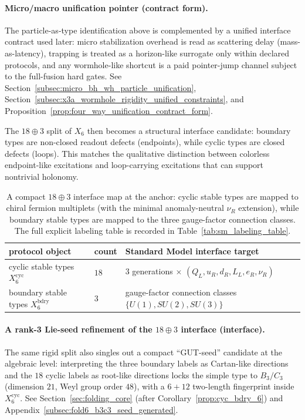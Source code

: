 \paragraph{Micro/macro unification pointer (contract form).}
\AuditTag The particle-as-type identification above is complemented by a unified interface contract used later:
micro stabilization overhead is read as scattering delay (mass-as-latency), trapping is treated as a horizon-like surrogate only within declared protocols,
and any wormhole-like shortcut is a paid pointer-jump channel subject to the full-fusion hard gates.
See Section~\ref{subsec:micro_bh_wh_particle_unification}, Section~\ref{subsec:x3a_wormhole_rigidity_unified_constraints}, and
Proposition~\ref{prop:four_way_unification_contract_form}.

The $18\oplus 3$ split of $X_6$ then becomes a structural interface candidate:
boundary types are non-closed readout defects (endpoints), while cyclic types are closed defects (loops).
This matches the qualitative distinction between colorless endpoint-like excitations and loop-carrying excitations that can support nontrivial holonomy.

\begin{table}[t]
\centering
\small
\setlength{\tabcolsep}{10pt}
\renewcommand{\arraystretch}{1.15}
\begin{tabular}{lll}
\toprule
protocol object & count & Standard Model interface target \\
\midrule
cyclic stable types $X_6^{\mathrm{cyc}}$ & $18$ & $3$ generations $\times$ $(Q_L,u_R,d_R,L_L,e_R,\nu_R)$ \\
boundary stable types $X_6^{\mathrm{bdry}}$ & $3$ & gauge-factor connection classes $\{U(1),SU(2),SU(3)\}$ \\
\bottomrule
\end{tabular}
\caption{A compact $18\oplus 3$ interface map at the anchor: cyclic stable types are mapped to chiral fermion multiplets (with the minimal anomaly-neutral $\nu_R$ extension), while boundary stable types are mapped to the three gauge-factor connection classes. The full explicit labeling table is recorded in Table~\ref{tab:sm_labeling_table}.}
\label{tab:hpa_18_3_sm_interface}
\end{table}

\paragraph{A rank-3 Lie-seed refinement of the \texorpdfstring{$18\oplus 3$}{18+3} interface (interface).}
\InterfaceTag The same rigid split also singles out a compact ``GUT-seed'' candidate at the algebraic level:
interpreting the three boundary labels as Cartan-like directions and the $18$ cyclic labels as root-like directions locks the simple type to $B_3/C_3$ (dimension $21$, Weyl group order $48$), with a $6+12$ two-length fingerprint inside $X_6^{\mathrm{cyc}}$.
See Section~\ref{sec:folding_core} (after Corollary~\ref{prop:cyc_bdry_6}) and Appendix~\ref{subsec:fold6_b3c3_seed_generated}.


